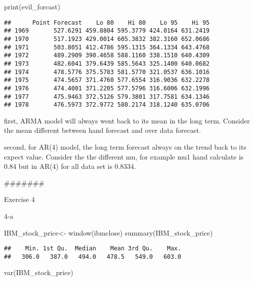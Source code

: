 \documentclass[
]{article}
\newenvironment{Shaded}{\begin{snugshade}}{\end{snugshade}}
\newcommand{\FunctionTok}[1]{\textcolor[rgb]{0.00,0.00,0.00}{#1}}
\newcommand{\NormalTok}[1]{#1}
\newcommand{\OtherTok}[1]{\textcolor[rgb]{0.56,0.35,0.01}{#1}}
\begin{document}
\begin{Shaded}
\begin{Highlighting}[]
\FunctionTok{print}\NormalTok{(evil\_forcast)}
\end{Highlighting}
\end{Shaded}

\begin{verbatim}
##      Point Forecast    Lo 80    Hi 80    Lo 95    Hi 95
## 1969       527.6291 459.8804 595.3779 424.0164 631.2419
## 1970       517.1923 429.0014 605.3832 382.3160 652.0686
## 1971       503.8051 412.4786 595.1315 364.1334 643.4768
## 1972       489.2909 390.4658 588.1160 338.1510 640.4309
## 1973       482.6041 379.6439 585.5643 325.1400 640.0682
## 1974       478.5776 375.5783 581.5770 321.0537 636.1016
## 1975       474.5657 371.4760 577.6554 316.9036 632.2278
## 1976       474.4001 371.2205 577.5796 316.6006 632.1996
## 1977       475.9463 372.5126 579.3801 317.7581 634.1346
## 1978       476.5973 372.9772 580.2174 318.1240 635.0706
\end{verbatim}

first, ARMA model will always went back to its mean in the long term.
Consider the mean different between hand forecast and over data
forecast.

second, for AR(4) model, the long term forecast always on the trend back
to its expect value. Consider the the different mu, for example mu1 hand
calculate is 0.84 but in AR(4) for all data set is 0.8334.

\#\#\#\#\#\#\#

Exercise 4

4-a

\begin{Shaded}
\begin{Highlighting}[]
\NormalTok{IBM\_stock\_price}\OtherTok{\textless{}{-}} \FunctionTok{window}\NormalTok{(ibmclose)}
\FunctionTok{summary}\NormalTok{(IBM\_stock\_price)}
\end{Highlighting}
\end{Shaded}

\begin{verbatim}
##    Min. 1st Qu.  Median    Mean 3rd Qu.    Max. 
##   306.0   387.0   494.0   478.5   549.0   603.0
\end{verbatim}

\begin{Shaded}
\begin{Highlighting}[]
\FunctionTok{var}\NormalTok{(IBM\_stock\_price)}
\end{Highlighting}
\end{Shaded}
\end{document}
